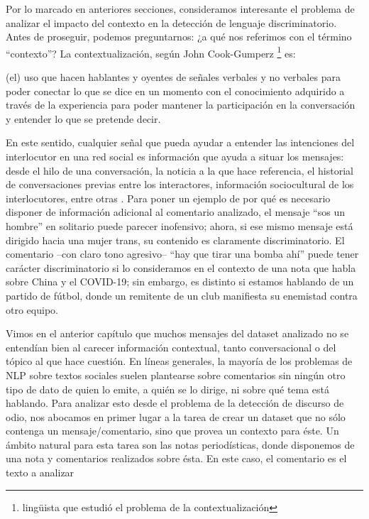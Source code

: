 \label{chap:05_dataset_creation}

Por lo marcado en anteriores secciones, consideramos interesante el problema de analizar el impacto del contexto en la detección de lenguaje discriminatorio. Antes de proseguir, podemos preguntarnos: ¿a qué nos referimos con el término ``contexto''? La contextualización, según John Cook-Gumperz \footnote{lingüista que estudió el problema de la contextualización} es:

\begin{displayquote}
    (el) uso que hacen hablantes y oyentes de señales verbales y no verbales para poder conectar lo que se dice en un momento con el conocimiento adquirido a través de la experiencia para poder mantener la participación en la conversación y entender lo que se pretende decir.
\end{displayquote}

En este sentido, cualquier señal que pueda ayudar a entender las intenciones del interlocutor en una red social es información que ayuda a situar los mensajes: desde el hilo de una conversación, la noticia a la que hace referencia, el historial de conversaciones previas entre los interactores, información sociocultural de los interlocutores, entre otras \cite{sheth2021defining}. Para poner un ejemplo de por qué es necesario disponer de información adicional al comentario analizado, el mensaje ``sos un hombre'' en solitario puede parecer inofensivo; ahora, si ese mismo mensaje está dirigido hacia una mujer trans, su contenido es claramente discriminatorio. El comentario --con claro tono agresivo-- ``hay que tirar una bomba ahí'' puede tener carácter discriminatorio si lo consideramos en el contexto de una nota que habla sobre China y el COVID-19; sin embargo, es distinto si estamos hablando de un partido de fútbol, donde un remitente de un club manifiesta su enemistad contra otro equipo.


Vimos en el anterior capítulo que muchos mensajes del dataset analizado no se entendían bien al carecer información contextual, tanto conversacional o del tópico al que hace cuestión. En líneas generales, la mayoría de los problemas de NLP sobre textos sociales suelen plantearse sobre comentarios sin ningún otro tipo de dato de quien lo emite, a quién se lo dirige, ni sobre qué tema está hablando. Para analizar esto desde el problema de la detección de discurso de odio, nos abocamos en primer lugar a la tarea de crear un dataset que no sólo contenga un mensaje/comentario, sino que provea un contexto para éste. Un ámbito natural para esta tarea son las notas periodísticas, donde disponemos de una nota y comentarios realizados sobre ésta. En este caso, el comentario es el texto a analizar

